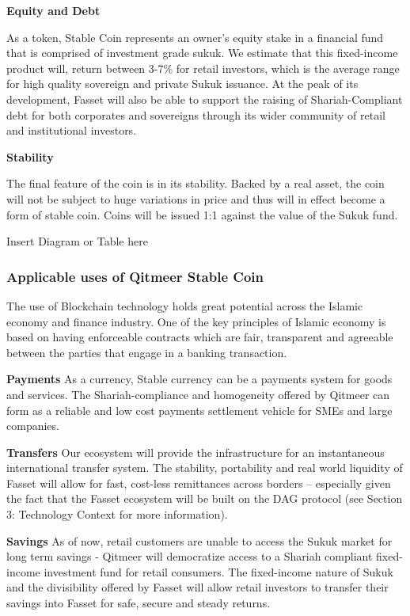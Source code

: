 \documentclass[a4paper,11pt]{article}
\begin{document}
\textbf{Equity and Debt}

As a token, Stable Coin represents an owner’s equity stake in a financial fund that is comprised of investment grade sukuk. We estimate that this fixed-income product will, return between 3-7\% for retail investors, which is the average range for high quality sovereign and private Sukuk issuance. At the peak of its development, Fasset will also be able to support the raising of Shariah-Compliant debt for both corporates and sovereigns through its wider community of retail and institutional investors.  

\textbf{Stability}

The final feature of the coin is in its stability. Backed by a real asset, the coin will not be subject to huge variations in price and thus will in effect become a form of stable coin. Coins will be issued 1:1 against the value of the Sukuk fund.

Insert Diagram or Table here

\subsubsection{Applicable uses of Qitmeer Stable Coin}

The use of Blockchain technology holds great potential across the Islamic economy and finance industry. One of the key principles of Islamic economy is based on having enforceable contracts which are fair, transparent and agreeable between the parties that engage in a banking transaction.

\textbf{Payments}  
As a currency, Stable currency can be a payments system for goods and services. The Shariah-compliance and homogeneity offered by Qitmeer can form as a reliable and low cost payments settlement vehicle for SMEs and large companies. 

\textbf{Transfers}
Our ecosystem will provide the infrastructure for an instantaneous international transfer system. The stability, portability and real world liquidity of Fasset will allow for fast, cost-less remittances across borders – especially given the fact that the Fasset ecosystem will be built on the DAG protocol (see Section 3: Technology Context for more information).  

\textbf{Savings} 
As of now, retail customers are unable to access the Sukuk market for long term savings - Qitmeer will democratize access to a Shariah compliant fixed-income investment fund for retail consumers. The fixed-income nature of Sukuk and the divisibility offered by Fasset will allow retail investors to transfer their savings into Fasset for safe, secure and steady returns. 
\end{document}
